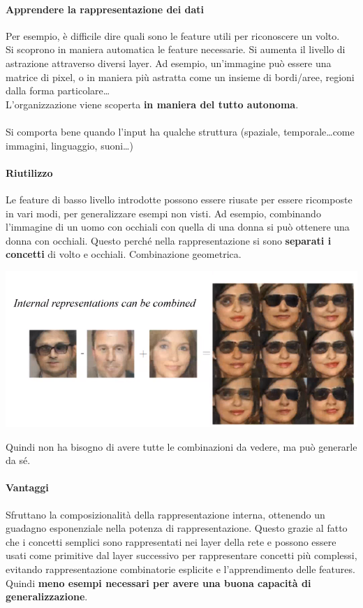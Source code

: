 \documentclass[10pt]{book}
\begin{document}
\paragraph{Apprendere la rappresentazione dei dati} Per esempio, è difficile dire quali sono le feature utili per riconoscere un volto.\\
Si scoprono in maniera automatica le feature necessarie. Si aumenta il livello di astrazione attraverso diversi layer. Ad esempio, un'immagine può essere una matrice di pixel, o in maniera più astratta come un insieme di bordi/aree, regioni dalla forma particolare\ldots\\
L'organizzazione viene scoperta \textbf{in maniera del tutto autonoma}.\\\\
Si comporta bene quando l'input ha qualche struttura (spaziale, temporale\ldots come immagini, linguaggio, suoni\ldots)
\paragraph{Riutilizzo} Le feature di basso livello introdotte possono essere riusate per essere ricomposte in vari modi, per generalizzare esempi non visti. Ad esempio, combinando l'immagine di un uomo con occhiali con quella di una donna si può ottenere una donna con occhiali. Questo perché nella rappresentazione si sono \textbf{separati i concetti} di volto e occhiali. Combinazione geometrica.
\begin{center}
	\includegraphics[scale=0.75]{dl2.png}
\end{center}
Quindi non ha bisogno di avere tutte le combinazioni da vedere, ma può generarle da sé.
\paragraph{Vantaggi} Sfruttano la composizionalità della rappresentazione interna, ottenendo un guadagno esponenziale nella potenza di rappresentazione. Questo grazie al fatto che i concetti semplici sono rappresentati nei layer della rete e possono essere usati come primitive dal layer successivo per rappresentare concetti più complessi, evitando rappresentazione combinatorie esplicite e l'apprendimento delle features.\\
Quindi \textbf{meno esempi necessari per avere una buona capacità di generalizzazione}.
\end{document}
